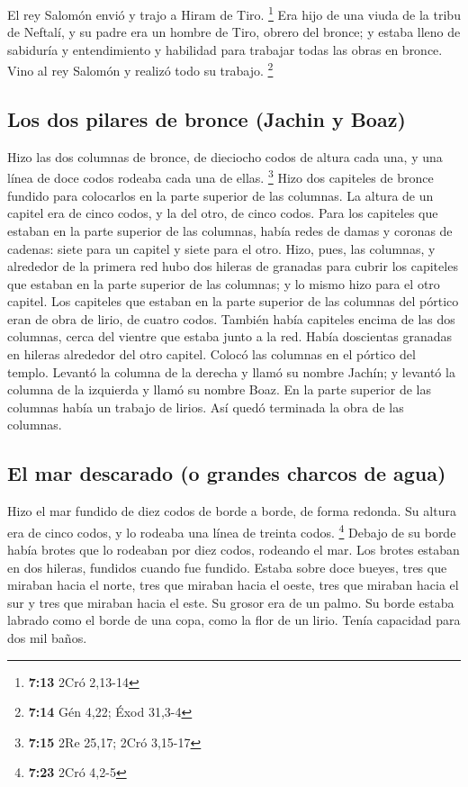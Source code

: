 \begin{paracol}{2}
 El rey Salomón envió y trajo a Hiram de Tiro.
\footnote{\textbf{7:13} 2Cró 2,13-14}  Era hijo de una
viuda de la tribu de Neftalí, y su padre era un hombre de Tiro, obrero
del bronce; y estaba lleno de sabiduría y entendimiento y habilidad para
trabajar todas las obras en bronce. Vino al rey Salomón y realizó todo
su trabajo. \footnote{\textbf{7:14} Gén 4,22; Éxod 31,3-4}

\hypertarget{los-dos-pilares-de-bronce-jachin-y-boaz}{%
\subsection{Los dos pilares de bronce (Jachin y
Boaz)}\label{los-dos-pilares-de-bronce-jachin-y-boaz}}

 Hizo las dos columnas de bronce, de dieciocho codos de
altura cada una, y una línea de doce codos rodeaba cada una de ellas.
\footnote{\textbf{7:15} 2Re 25,17; 2Cró 3,15-17}  Hizo
dos capiteles de bronce fundido para colocarlos en la parte superior de
las columnas. La altura de un capitel era de cinco codos, y la del otro,
de cinco codos.  Para los capiteles que estaban en la
parte superior de las columnas, había redes de damas y coronas de
cadenas: siete para un capitel y siete para el otro. 
Hizo, pues, las columnas, y alrededor de la primera red hubo dos hileras
de granadas para cubrir los capiteles que estaban en la parte superior
de las columnas; y lo mismo hizo para el otro capitel. 
Los capiteles que estaban en la parte superior de las columnas del
pórtico eran de obra de lirio, de cuatro codos.  También
había capiteles encima de las dos columnas, cerca del vientre que estaba
junto a la red. Había doscientas granadas en hileras alrededor del otro
capitel.  Colocó las columnas en el pórtico del templo.
Levantó la columna de la derecha y llamó su nombre Jachín; y levantó la
columna de la izquierda y llamó su nombre Boaz.  En la
parte superior de las columnas había un trabajo de lirios. Así quedó
terminada la obra de las columnas.

\hypertarget{el-mar-descarado-o-grandes-charcos-de-agua}{%
\subsection{El mar descarado (o grandes charcos de
agua)}\label{el-mar-descarado-o-grandes-charcos-de-agua}}

 Hizo el mar fundido de diez codos de borde a borde, de
forma redonda. Su altura era de cinco codos, y lo rodeaba una línea de
treinta codos. \footnote{\textbf{7:23} 2Cró 4,2-5} 
Debajo de su borde había brotes que lo rodeaban por diez codos, rodeando
el mar. Los brotes estaban en dos hileras, fundidos cuando fue fundido.
 Estaba sobre doce bueyes, tres que miraban hacia el
norte, tres que miraban hacia el oeste, tres que miraban hacia el sur y
tres que miraban hacia el este.  Su grosor era de un
palmo. Su borde estaba labrado como el borde de una copa, como la flor
de un lirio. Tenía capacidad para dos mil baños.


\end{paracol}
